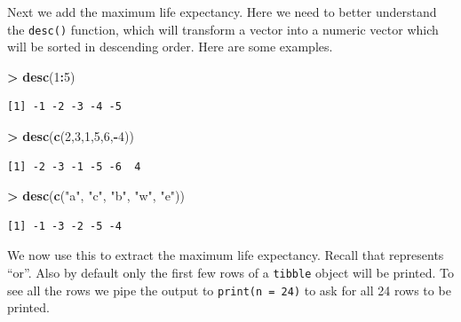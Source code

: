 \documentclass[]{krantz}
\makeatletter
\newenvironment{Shaded}{\begin{snugshade}}{\end{snugshade}}
\newcommand{\KeywordTok}[1]{\textcolor[rgb]{0.27,0.27,0.27}{\textbf{#1}}}
\newcommand{\DecValTok}[1]{\textcolor[rgb]{0.06,0.06,0.06}{#1}}
\newcommand{\StringTok}[1]{\textcolor[rgb]{0.5,0.5,0.5}{#1}}
\newcommand{\OperatorTok}[1]{\textcolor[rgb]{0.43,0.43,0.43}{\textbf{#1}}}
\newcommand{\NormalTok}[1]{#1}
\newenvironment{kframe}{%
\medskip{}
\setlength{\fboxsep}{.8em}
 \def\at@end@of@kframe{}%
 \ifinner\ifhmode%
  \def\at@end@of@kframe{\end{minipage}}%
  \begin{minipage}{\columnwidth}%
 \fi\fi%
 \def\FrameCommand##1{\hskip\@totalleftmargin \hskip-\fboxsep
 \colorbox{shadecolor}{##1}\hskip-\fboxsep
     \hskip-\linewidth \hskip-\@totalleftmargin \hskip\columnwidth}%
 \MakeFramed {\advance\hsize-\width
   \@totalleftmargin\z@ \linewidth\hsize
   \@setminipage}}%
 {\par\unskip\endMakeFramed%
 \at@end@of@kframe}
\renewenvironment{Shaded}{\begin{kframe}}{\end{kframe}}
\makeatother
\begin{document}
Next we add the maximum life expectancy. Here we need to better
understand the \texttt{desc()} function, which will transform a vector
into a numeric vector which will be sorted in descending order. Here are
some examples.

\begin{Shaded}
\begin{Highlighting}[]
\OperatorTok{>}\StringTok{ }\KeywordTok{desc}\NormalTok{(}\DecValTok{1}\OperatorTok{:}\DecValTok{5}\NormalTok{)}
\end{Highlighting}
\end{Shaded}

\begin{verbatim}
[1] -1 -2 -3 -4 -5
\end{verbatim}

\begin{Shaded}
\begin{Highlighting}[]
\OperatorTok{>}\StringTok{ }\KeywordTok{desc}\NormalTok{(}\KeywordTok{c}\NormalTok{(}\DecValTok{2}\NormalTok{,}\DecValTok{3}\NormalTok{,}\DecValTok{1}\NormalTok{,}\DecValTok{5}\NormalTok{,}\DecValTok{6}\NormalTok{,}\OperatorTok{-}\DecValTok{4}\NormalTok{))}
\end{Highlighting}
\end{Shaded}

\begin{verbatim}
[1] -2 -3 -1 -5 -6  4
\end{verbatim}

\begin{Shaded}
\begin{Highlighting}[]
\OperatorTok{>}\StringTok{ }\KeywordTok{desc}\NormalTok{(}\KeywordTok{c}\NormalTok{(}\StringTok{"a"}\NormalTok{, }\StringTok{"c"}\NormalTok{, }\StringTok{"b"}\NormalTok{, }\StringTok{"w"}\NormalTok{, }\StringTok{"e"}\NormalTok{))}
\end{Highlighting}
\end{Shaded}

\begin{verbatim}
[1] -1 -3 -2 -5 -4
\end{verbatim}

We now use this to extract the maximum life expectancy. Recall that
\texttt{\textbar{}} represents ``or''. Also by default only the first
few rows of a \texttt{tibble} object will be printed. To see all the
rows we pipe the output to \texttt{print(n\ =\ 24)} to ask for all 24
rows to be printed.
\end{document}
